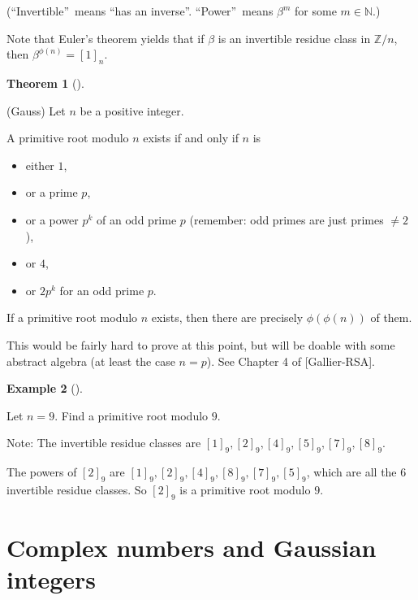 \documentclass[numbers=enddot,12pt,final,onecolumn,notitlepage]{scrartcl}%
\numberwithin{exer}{subsection}
\theoremstyle{definition}
\newtheorem{theo}{Theorem}[subsection]
\newenvironment{theorem}[1][]
{\begin{theo}[#1]\begin{leftbar}}
{\end{leftbar}\end{theo}}
\newtheorem{exam}[theo]{Example}
\newenvironment{example}[1][]
{\begin{exam}[#1]\begin{leftbar}}
{\end{leftbar}\end{exam}}
\begin{document}
(\textquotedblleft Invertible\textquotedblright\ means \textquotedblleft has
an inverse\textquotedblright. \textquotedblleft Power\textquotedblright\ means
$\beta^{m}$ for some $m\in\mathbb{N}$.)

Note that Euler's theorem yields that if $\beta$ is an invertible residue
class in $\mathbb{Z}/n$, then $\beta^{\phi\left(  n\right)  }=\left[
1\right]  _{n}$.

\begin{theorem}
(Gauss) Let $n$ be a positive integer.

A primitive root modulo $n$ exists if and only if $n$ is

\begin{itemize}
\item either $1$,

\item or a prime $p$,

\item or a power $p^{k}$ of an odd prime $p$ (remember: odd primes are just
primes $\neq2$),

\item or $4$,

\item or $2p^{k}$ for an odd prime $p$.
\end{itemize}

If a primitive root modulo $n$ exists, then there are precisely $\phi\left(
\phi\left(  n\right)  \right)  $ of them.
\end{theorem}

This would be fairly hard to prove at this point, but will be doable with some
abstract algebra (at least the case $n=p$). See Chapter 4 of [Gallier-RSA].

\begin{example}
Let $n=9$. Find a primitive root modulo $9$.

Note: The invertible residue classes are $\left[  1\right]  _{9},\left[
2\right]  _{9},\left[  4\right]  _{9},\left[  5\right]  _{9},\left[  7\right]
_{9},\left[  8\right]  _{9}$.

The powers of $\left[  2\right]  _{9}$ are $\left[  1\right]  _{9},\left[
2\right]  _{9},\left[  4\right]  _{9},\left[  8\right]  _{9},\left[  7\right]
_{9},\left[  5\right]  _{9}$, which are all the $6$ invertible residue
classes. So $\left[  2\right]  _{9}$ is a primitive root modulo $9$.
\end{example}

\section{Complex numbers and Gaussian integers}
\end{document}
